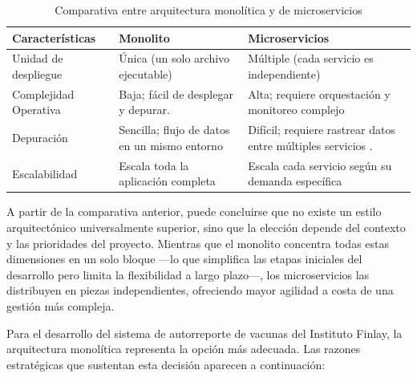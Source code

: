 \begin{table}[H]
	\centering
    \caption{Comparativa entre arquitectura monolítica y de microservicios}
	\label{tab:monolito_microservicios}
	
	\renewcommand{\arraystretch}{1.3}
	
	\begin{tabular}{|p{3.2cm}| p{4.3cm}| p{4.3cm}|}
        \hline
		
		\textbf{Características} & \textbf{Monolito} & \textbf{Microservicios}\\[6pt]
        \hline
		
		Unidad de despliegue &
	    Única (un solo archivo ejecutable) \cite{ibm_microservices_monolith} &
		Múltiple (cada servicio es independiente) \cite{aws_monolith_microservices} \\[6pt]
		\hline

		Complejidad Operativa &
        Baja; fácil de desplegar y depurar. \cite{ibm_microservices_monolith} &
		Alta; requiere orquestación y monitoreo complejo \cite{aws_monolith_microservices}\\[6pt]
        \hline
		
		Depuración &
		Sencilla; flujo de datos en un mismo entorno \cite{ibm_microservices_monolith} &
		Difícil; requiere rastrear datos entre múltiples servicios \cite{aws_monolith_microservices}.  \\[6pt]
        \hline
		
		
	Escalabilidad
	& Escala toda la aplicación completa \cite{ibm_microservices_monolith}
	& Escala cada servicio según su demanda específica \cite{aws_monolith_microservices} \\
    \hline
	\end{tabular}
\end{table}

A partir de la comparativa anterior, puede concluirse que no existe un estilo arquitectónico universalmente superior, sino que la elección depende del contexto y las prioridades del proyecto. 
Mientras que el monolito concentra todas estas dimensiones en un solo bloque —lo que simplifica las etapas iniciales del desarrollo pero limita la flexibilidad a largo plazo—, los microservicios las distribuyen en piezas independientes, ofreciendo mayor agilidad a costa de una gestión más compleja.

Para el desarrollo del sistema de autorreporte de vacunas del Instituto Finlay, la arquitectura monolítica representa la opción más adecuada.
Las razones estratégicas que sustentan esta decisión aparecen a continuación:

